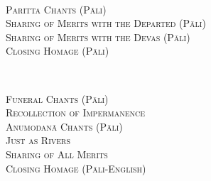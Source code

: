 {  \clearpage
  \vspace{1.5cm}

  {\libertinusFont\selectfont\textbf{\textsc{\fontsize{18}{12}\selectfont{}}}}\\

  \textsc{\fontsize{16}{28}\selectfont
    Paritta Chants (Pāli) \pageref{deva-aradhana}\\
    Sharing of Merits with the Departed (Pāli) \pageref{sharing-merits-departed}\\
    Sharing of Merits with the Devas (Pāli) \pageref{sharing-merits-devas}\\
    Closing Homage (Pāli) \pageref{closing-homage}\\
  }

  \vspace{1.5cm}

  {\libertinusFont\selectfont\textbf{\textsc{\fontsize{18}{12}\selectfont{}}}}\\

  \textsc{\fontsize{16}{28}\selectfont
    Funeral Chants (Pāli) \pageref{pubba-bhaga-nama-kara-patho}\\
    Recollection of Impermanence \pageref{recollection-impermanence}\\
    Anumodanā Chants (Pāli) \pageref{yatha-vari-vaha-pura}\\
    Just as Rivers \pageref{just-as-rivers}\\
    Sharing of All Merits \pageref{sharing-all-merits}\\
    Closing Homage (Pāli-English) \pageref{closing-homage}\\
  }}
